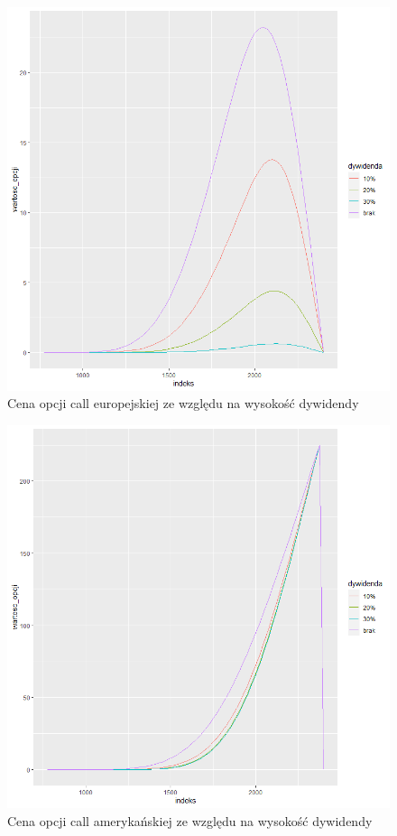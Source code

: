\documentclass[12pt]{article}
\begin{document}
\begin{figure}[H]
    \centering
    \includegraphics[width=\textwidth,height=\textheight,keepaspectratio]{dividend/zmiennosc_dywidendy_call_EU.png}
    \caption{Cena opcji call europejskiej ze względu na wysokość dywidendy}
    \label{fig:divi_wysokosc_call_EU}
\end{figure}

\begin{figure}[H]
    \centering
    \includegraphics[width=\textwidth,height=\textheight,keepaspectratio]{dividend/zmiennosc_dywidendy_call_A.png}
    \caption{Cena opcji call amerykańskiej ze względu na wysokość dywidendy}
    \label{fig:divi_wysokosc_call_A}
\end{figure}
\end{document}
